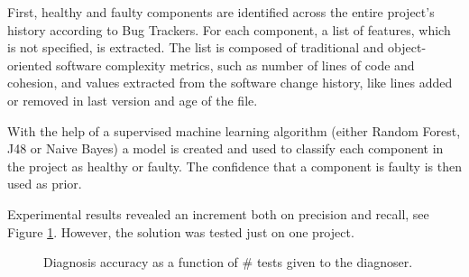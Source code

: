 First, healthy and faulty components are identified across the entire project's history according to Bug Trackers. For each component, a list of features, which is not specified, is extracted. The list is composed of traditional and object-oriented software complexity metrics, such as number of lines of code and cohesion, and values extracted from the software change history, like lines added or removed in last version and age of the file.

With the help of a supervised machine learning algorithm (either Random Forest, J48 or Naive Bayes) a model is created and used to classify each component in the project as healthy or faulty. The confidence that a component is faulty is then used as prior.

Experimental results revealed an increment both on precision and recall, see Figure \ref{fig:elmishali}. However, the solution was tested just on one project.
%
\begin{figure}%
    \centering
    \qquad
    \caption{Diagnosis accuracy as a function of \# tests given to the diagnoser. \cite{Elmishali}}%
    \label{fig:elmishali}%
\end{figure}
